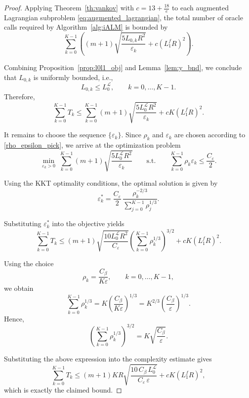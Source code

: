 \documentclass[runningheads]{llncs}
\begin{document}
	\begin{proof}
		Applying Theorem~\ref{th:vankov} with
		\(
		c = 13+\frac{18}{e}
		\)
		to each augmented Lagrangian subproblem \eqref{eq:augmented_lagrangian}, the total number of oracle calls required by Algorithm~\ref{alg:iALM} is bounded by
		\[
		\sum_{k=0}^{K-1}
		\left(
		(m+1)
		\sqrt{\frac{5 L_{0,k} R^2}{\varepsilon_k}}
		+
		c (L_1^f R)^2
		\right).
		\]
		
		Combining Proposition~\ref{prop:l0l1_obj} and Lemma~\ref{lem:y_bnd}, we conclude that \(L_{0,k}\) is uniformly bounded, i.e.,
		\[
		L_{0,k}\leq L_0^{\mathcal{L}},
		\qquad k=0,\ldots,K-1.
		\]
		Therefore,
		\[
		\sum_{k=0}^{K-1}T_k
		\leq
		\sum_{k=0}^{K-1}
		(m+1)
		\sqrt{\frac{5L_0^{\mathcal{L}} R^2}{\varepsilon_k}}
		+
		c K (L_1^f R)^2.
		\]
		
		It remains to choose the sequence \(\{\varepsilon_k\}\). Since \(\rho_k\) and \(\varepsilon_k\) are chosen according to \eqref{rho_epsilon_pick}, we arrive at the optimization problem
		\[
		\min_{\varepsilon_k>0}
		\;
		\sum_{k=0}^{K-1}
		(m+1)
		\sqrt{\frac{5L_0^{\mathcal{L}}R^2}{\varepsilon_k}}
		\qquad
		\text{s.t.}
		\qquad
		\sum_{k=0}^{K-1}\rho_k\varepsilon_k
		\leq
		\frac{C_\varepsilon}{2}.
		\]
		
		Using the KKT optimality conditions, the optimal solution is given by
		\[
		\varepsilon_k^*
		=
		\frac{C_\varepsilon}{2}
		\,
		\frac{\rho_k^{-2/3}}
		{\sum_{j=0}^{K-1}\rho_j^{1/3}}.
		\]
		
		Substituting \(\varepsilon_k^*\) into the objective yields
		\begin{equation}\label{conv_rate}
			\sum_{k=0}^{K-1}T_k
			\leq
			(m+1)
			\sqrt{\frac{10L_0^{\mathcal{L}}R^2}{C_\varepsilon}}
			\left(
			\sum_{k=0}^{K-1}\rho_k^{1/3}
			\right)^{3/2}
			+
			c K (L_1^f R)^2.
		\end{equation}
		
		Using the choice
		\[
		\rho_k=\frac{C_\beta}{K\varepsilon},
		\qquad k=0,\ldots,K-1,
		\]
		we obtain
		\[
		\sum_{k=0}^{K-1}\rho_k^{1/3}
		=
		K
		\left(
		\frac{C_\beta}{K\varepsilon}
		\right)^{1/3}
		=
		K^{2/3}
		\left(
		\frac{C_\beta}{\varepsilon}
		\right)^{1/3}.
		\]
		Hence,
		\[
		\left(
		\sum_{k=0}^{K-1}\rho_k^{1/3}
		\right)^{3/2}
		=
		K
		\sqrt{\frac{C_\beta}{\varepsilon}}.
		\]
		
		Substituting the above expression into the complexity estimate gives
		\[
		\sum_{k=0}^{K-1}T_k
		\leq
		(m+1)
		K R
		\sqrt{
			\frac{10\,C_\beta\,L_0^{\mathcal{L}}}
			{C_\varepsilon\,\varepsilon}
		}
		+
		cK(L_1^fR)^2,
		\]
		which is exactly the claimed bound.
	\end{proof}
	
\end{document}
